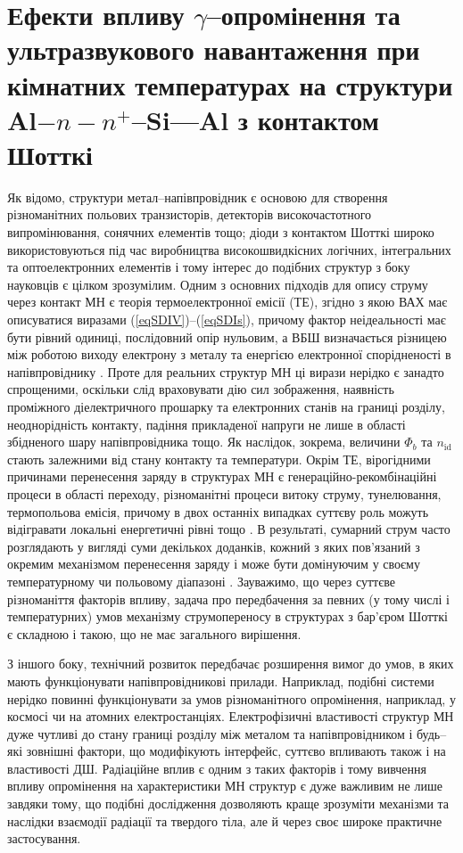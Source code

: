 \chapter{Ефекти впливу $\gamma$--опромінення та ультразвукового навантаження при кімнатних температурах
на структури Al$-n-n^+$--Si---Al з контактом Шотткі\label{Ch_GammaSD}}

Як відомо, структури метал--напівпровідник є основою для створення різноманітних польових транзисторів, детекторів високочастотного
випромінювання, сонячних елементів тощо;
діоди з контактом Шотткі широко використовуються під час виробництва високошвидкісних логічних, інтегральних та оптоелектронних елементів
і тому інтерес до подібних структур з боку науковців є цілком зрозумілим.
Одним з основних підходів для опису струму через контакт МН є теорія термоелектронної емісії (ТЕ),
згідно з якою \cite{Colinge,Sze2012,Rhoderick1988,StrihaBook} ВАХ має описуватися виразами (\ref{eqSDIV})--(\ref{eqSDIs}),
причому фактор неідеальності має бути рівний одиниці, послідовний опір нульовим,
а ВБШ визначається різницею між роботою виходу електрону з металу та енергією електронної спорідненості в напівпровіднику \cite{Colinge}.
Проте для реальних структур МН ці вирази нерідко є занадто спрощеними, оскільки
слід враховувати дію сил зображення, наявність проміжного діелектричного прошарку та електронних станів на границі розділу,
неоднорідність контакту, падіння прикладеної напруги не лише в області збідненого шару напівпровідника тощо.
Як наслідок, зокрема, величини $\Phi_b$ та $n_\mathrm{id}$ стають залежними від стану контакту та температури.
Окрім ТЕ, вірогідними причинами перенесення заряду в структурах МН є генераційно-рекомбінаційні процеси в області переходу,
різноманітні процеси витоку струму, тунелювання, термопольова емісія,
причому в двох останніх випадках суттєву роль можуть відігравати локальні енергетичні рівні тощо \cite{Rhoderick1988,Arslan,Donoval2010,Huang,Evstropov,VRH:Lee,Sathaiya}.
В результаті, сумарний струм часто розглядають у вигляді суми декількох доданків,
кожний з яких пов'язаний з окремим механізмом перенесення заряду і може бути домінуючим у своєму температурному чи польовому діапазоні \cite{Arslan,Donoval2010,Huang,GELCZUK2014}.
Зауважимо, що через суттєве різноманіття факторів впливу, задача про передбачення за певних
(у тому числі і температурних) умов механізму струмопереносу в структурах з бар'єром Шотткі є складною і такою, що не має загального вирішення.

З іншого боку, технічний розвиток передбачає розширення вимог до умов, в яких мають функціонувати напівпровідникові прилади.
Наприклад, подібні системи нерідко повинні функціонувати за умов різноманітного опромінення, наприклад, у космосі чи на атомних електростанціях.
Електрофізичні властивості структур МН дуже чутливі до стану границі розділу між металом та напівпровідником і будь--які
зовнішні фактори, що модифікують інтерфейс, суттєво впливають також і на властивості ДШ.
Радіаційне вплив є одним з таких факторів і тому вивчення впливу опромінення на характеристики МН структур є дуже важливим не лише завдяки
тому, що подібні дослідження дозволяють краще зрозуміти механізми та наслідки взаємодії радіації та твердого тіла,
але й через своє широке практичне застосування.


